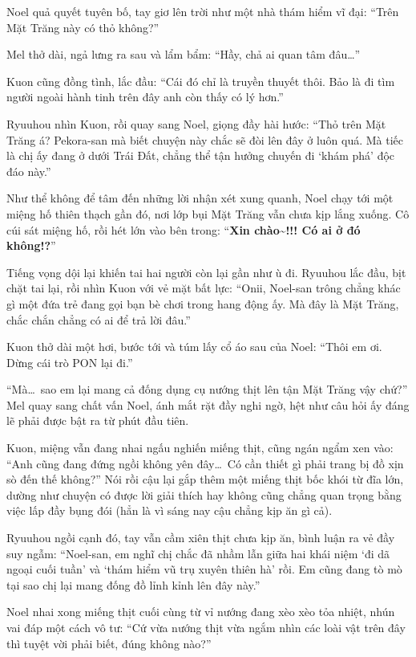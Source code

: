 \documentclass[../main.tex]{subfiles}
\begin{document}
Noel quả quyết tuyên bố, tay giơ lên trời như một nhà thám hiểm vĩ đại: ``Trên Mặt Trăng này có thỏ không?''

Mel thở dài, ngả lưng ra sau và lẩm bẩm: ``Hầy, chả ai quan tâm đâu\dots''

Kuon cũng đồng tình, lắc đầu: ``Cái đó chỉ là truyền thuyết thôi. Bảo là đi tìm người ngoài hành tinh trên đây anh còn thấy có lý hơn.''

Ryuuhou nhìn Kuon, rồi quay sang Noel, giọng đầy hài hước: ``Thỏ trên Mặt Trăng á? Pekora-san mà biết chuyện này chắc sẽ đòi lên đây ở luôn quá. Mà tiếc là chị ấy đang ở dưới Trái Đất, chẳng thể tận hưởng chuyến đi `khám phá' độc đáo này.''

Như thể không để tâm đến những lời nhận xét xung quanh, Noel chạy tới một miệng hố thiên thạch gần đó, nơi lớp bụi Mặt Trăng vẫn chưa kịp lắng xuống. Cô cúi sát miệng hố, rồi hét lớn vào bên trong: ``\textbf{Xin chào\~{}!!! Có ai ở đó không!?}''


Tiếng vọng dội lại khiến tai hai người còn lại gần như ù đi. Ryuuhou lắc đầu, bịt chặt tai lại, rồi nhìn Kuon với vẻ mặt bất lực: ``Onii, Noel-san trông chẳng khác gì một đứa trẻ đang gọi bạn bè chơi trong hang động ấy. Mà đây là Mặt Trăng, chắc chắn chẳng có ai để trả lời đâu.''

Kuon thở dài một hơi, bước tới và túm lấy cổ áo sau của Noel: ``Thôi em ơi. Dừng cái trò PON lại đi.''

\ct

``Mà\dots\ sao em lại mang cả đống dụng cụ nướng thịt lên tận Mặt Trăng vậy chứ?'' Mel quay sang chất vấn Noel, ánh mắt rặt đầy nghi ngờ, hệt như câu hỏi ấy đáng lẽ phải được bật ra từ phút đầu tiên.

Kuon, miệng vẫn đang nhai ngấu nghiến miếng thịt, cũng ngán ngẩm xen vào: ``Anh cũng đang đứng ngồi không yên đây\dots\ Có cần thiết gì phải trang bị đồ xịn sò đến thế không?'' Nói rồi cậu lại gắp thêm một miếng thịt bốc khói từ đĩa lớn, dường như chuyện có được lời giải thích hay không cũng chẳng quan trọng bằng việc lấp đầy bụng đói (hẳn là vì sáng nay cậu chẳng kịp ăn gì cả).

Ryuuhou ngồi cạnh đó, tay vẫn cầm xiên thịt chưa kịp ăn, bình luận ra vẻ đầy suy ngẫm: ``Noel-san, em nghĩ chị chắc đã nhầm lẫn giữa hai khái niệm `đi dã ngoại cuối tuần' và `thám hiểm vũ trụ xuyên thiên hà' rồi. Em cũng đang tò mò tại sao chị lại mang đống đồ lỉnh kỉnh lên đây này.''

Noel nhai xong miếng thịt cuối cùng từ vỉ nướng đang xèo xèo tỏa nhiệt, nhún vai đáp một cách vô tư: ``Cứ vừa nướng thịt vừa ngắm nhìn các loài vật trên đây thì tuyệt vời phải biết, đúng không nào?''
\end{document}
